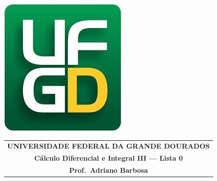 \documentclass[a4paper,5pt]{amsbook}
\begin{document}
\thispagestyle{empty}
\pagestyle{empty}
\begin{minipage}[h]{0.14\textwidth}
	\includegraphics[scale=0.24]{../../ufgd.png}
\end{minipage}
\begin{minipage}[h]{\textwidth}
\begin{tabular}{c}
{{\bf UNIVERSIDADE FEDERAL DA GRANDE DOURADOS}}\\
{{\bf C\'alculo Diferencial e Integral III --- Lista 0}}\\
{{\bf Prof.\ Adriano Barbosa}}\\
\end{tabular}
\vspace{-0.45cm}
%
\end{minipage}

\end{document}

